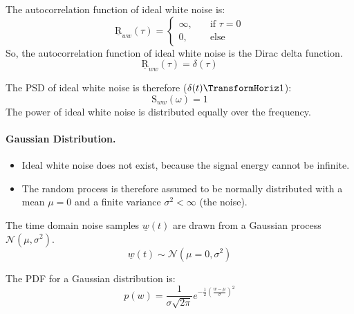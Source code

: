 \begin{refsection}
The autocorrelation function of ideal white noise is:
\begin{equation}
	\underline{\mathrm{R}}_{ww}(\tau) = \begin{cases}
		\infty, & \quad \text{if } \tau = 0 \\
		0, & \quad \text{else}
	\end{cases}
\end{equation}
So, the autocorrelation function of ideal white noise is the Dirac delta function.
\begin{equation}
	\underline{\mathrm{R}}_{ww}(\tau) = \delta(\tau)
\end{equation}

The \ac{PSD} of ideal white noise is therefore ($\delta(t) \TransformHoriz 1$):
\begin{equation}
	\mathrm{S}_{ww}(\omega) = 1
\end{equation}
The power of ideal white noise is distributed equally over the frequency.

\paragraph{Gaussian Distribution.}

\begin{itemize}
	\item Ideal white noise does not exist, because the signal energy cannot be infinite.
	\item The random process is therefore assumed to be normally distributed with a mean $\mu = 0$ and a finite variance $\sigma^2 < \infty$ (the noise).
\end{itemize}

The time domain noise samples $\underline{w}(t)$ are drawn from a Gaussian process $\mathcal{N}(\mu, \sigma^2)$.
\begin{equation}
	\underline{w}(t) \sim \mathcal{N}(\mu = 0, \sigma^2)
\end{equation}

The \ac{PDF} for a Gaussian distribution is:
\begin{equation}
	p(w) = \frac{1}{\sigma \sqrt{2 \pi}} e^{-\frac{1}{2} \left(\frac{w - \mu}{\sigma}\right)^2}
\end{equation}


\end{refsection}
